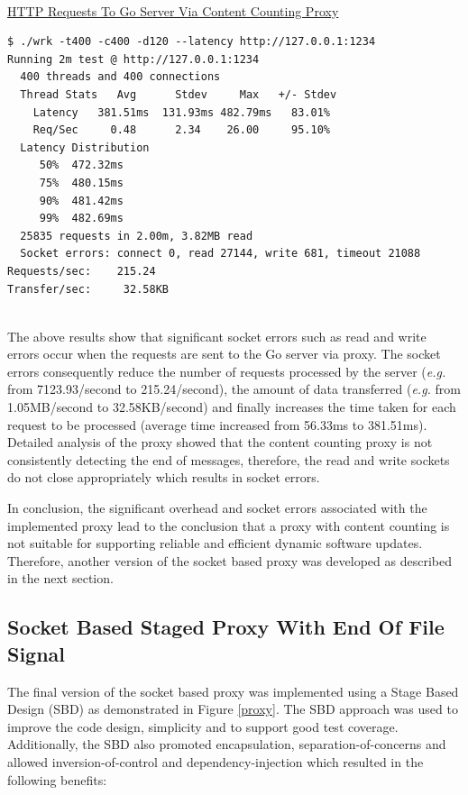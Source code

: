 \documentclass[a4paper,11pt,twoside]{report}
\begin{document}
\noindent\\
\underline{HTTP Requests To Go Server Via Content Counting Proxy} 
\begin{lstlisting}[language=terminal]
$ ./wrk -t400 -c400 -d120 --latency http://127.0.0.1:1234
Running 2m test @ http://127.0.0.1:1234
  400 threads and 400 connections
  Thread Stats   Avg      Stdev     Max   +/- Stdev
    Latency   381.51ms  131.93ms 482.79ms   83.01%
    Req/Sec     0.48      2.34    26.00     95.10%
  Latency Distribution
     50%  472.32ms
     75%  480.15ms
     90%  481.42ms
     99%  482.69ms
  25835 requests in 2.00m, 3.82MB read
  Socket errors: connect 0, read 27144, write 681, timeout 21088
Requests/sec:    215.24
Transfer/sec:     32.58KB
\end{lstlisting}


\noindent \\
The above results show that significant socket errors such as read and write errors occur when the requests are sent to the Go server via proxy. The socket errors consequently reduce the number of requests processed by the server (\textit{e.g.} from 7123.93/second to  215.24/second), the amount of data transferred (\textit{e.g.} from 1.05MB/second to 32.58KB/second) and finally increases the time taken for each request to be processed (average time increased from 56.33ms to 381.51ms). Detailed analysis of the proxy showed that the content counting proxy is not consistently detecting the end of messages, therefore, the read and write sockets do not close appropriately which results in socket errors. 

In conclusion, the significant overhead and socket errors associated with the implemented proxy lead to the conclusion that a proxy with content counting is not suitable for supporting reliable and efficient dynamic software updates. Therefore, another version of the socket based proxy was developed as described in the next section.

\subsection{Socket Based Staged Proxy With End Of File Signal}\label{staged}
The final version of the socket based proxy was implemented using a Stage Based Design (SBD) as demonstrated in Figure \ref{proxy}. The SBD approach was used to improve the code design, simplicity and to support good test coverage. Additionally, the SBD also promoted encapsulation, separation-of-concerns and allowed inversion-of-control and dependency-injection which resulted in the following benefits:
\end{document}
